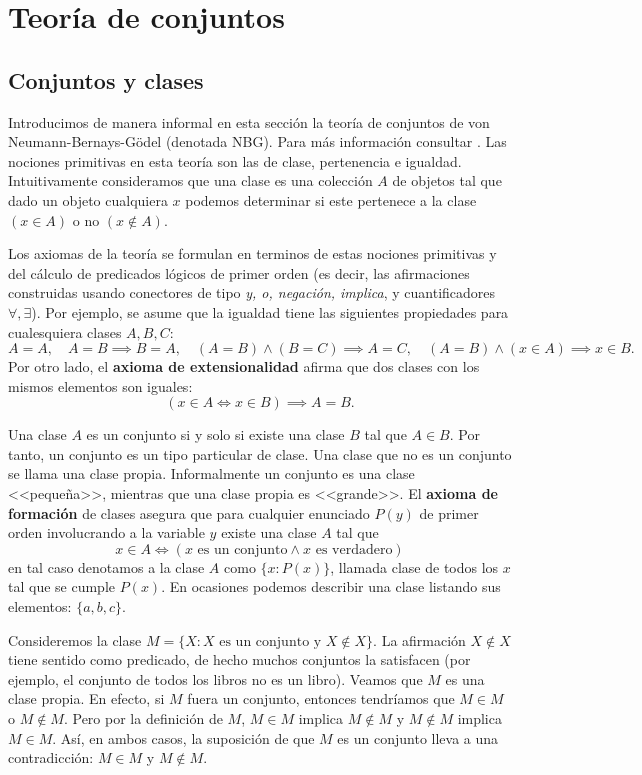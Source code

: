 \appendix
\chapter{Teoría de conjuntos}

\section{Conjuntos y clases}

Introducimos de manera informal en esta sección la teoría de conjuntos de von Neumann-Bernays-Gödel (denotada NBG). Para más información consultar \cite{enwiki:1281064703}. Las nociones primitivas en esta teoría son las de clase, pertenencia e igualdad. Intuitivamente consideramos que una clase es una colección $A$ de objetos tal que dado un objeto cualquiera $x$ podemos determinar si este pertenece a la clase $(x \in A)$ o no $(x \notin A)$.

Los axiomas de la teoría se formulan en terminos de estas nociones primitivas y del cálculo de predicados lógicos de primer orden (es decir, las afirmaciones construidas usando conectores de tipo \textit{y, o, negación, implica}, y cuantificadores $\forall, \exists$). Por ejemplo, se asume que la igualdad tiene las siguientes propiedades para cualesquiera clases $A,B,C$:
\[
A=A,\quad A=B \implies B=A,\quad (A=B) \land (B=C) \implies A=C,\quad (A=B) \land (x \in A) \implies x \in B.
\]
Por otro lado, el \textbf{axioma de extensionalidad} afirma que dos clases con los mismos elementos son iguales:
\[
(x \in A \iff x \in B) \implies A = B.
\]

Una clase $A$ es un conjunto si y solo si existe una clase $B$ tal que $A \in B$. Por tanto, un conjunto es un tipo particular de clase. Una clase que no es un conjunto se llama una clase propia. Informalmente un conjunto es una clase <<pequeña>>, mientras que una clase propia es <<grande>>. El \textbf{axioma de formación} de clases asegura que para cualquier enunciado $P(y)$ de primer orden involucrando a la variable $y$ existe una clase $A$ tal que
\[
x \in A \iff (x \text{ es un conjunto} \land x \text{ es verdadero})
\]
en tal caso denotamos a la clase $A$ como $\{x : P(x)\}$, llamada clase de todos los $x$ tal que se cumple $P(x)$. En ocasiones podemos describir una clase listando sus elementos: $\{a,b,c\}$.

\begin{example}
    Consideremos la clase \( M = \{X : X \text{ es un conjunto y } X \notin X\} \). La afirmación \( X \notin X \) tiene sentido como predicado, de hecho muchos conjuntos la satisfacen (por ejemplo, el conjunto de todos los libros no es un libro). Veamos que \( M \) es una clase propia. En efecto, si \( M \) fuera un conjunto, entonces tendríamos que \( M \in M \) o \( M \notin M \). Pero por la definición de \( M \), \( M \in M \) implica \( M \notin M \) y \( M \notin M \) implica \( M \in M \). Así, en ambos casos, la suposición de que \( M \) es un conjunto lleva a una contradicción: \( M \in M \) y \( M \notin M \).
\end{example}

